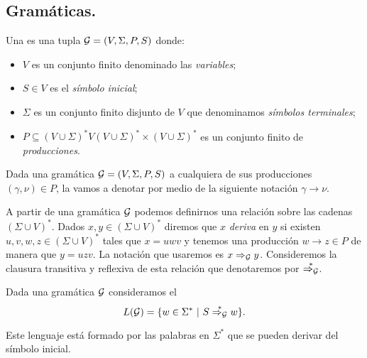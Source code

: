 \documentclass[tesis.tex]{subfiles}
\begin{document}
\subsection{Gramáticas.}

\begin{deff}
	Una  es una tupla ${\cal G} = (V, \Sigma, P, S)$ donde:
	\begin{itemize}
		\item $V$ es un conjunto finito denominado las \emph{variables};
		\item $S \in V$ es el \emph{símbolo inicial};
		\item $\Sigma$ es un conjunto finito disjunto de $V$ que denominamos \emph{símbolos terminales};
		\item $P \subseteq (V \cup \Sigma)^*V(V \cup \Sigma)^* \times (V \cup \Sigma)^*$ es un conjunto finito de \emph{producciones}.
	\end{itemize}
\end{deff}

Dada una gramática ${\cal G} = (V, \Sigma, P, S)$ a cualquiera de sus producciones $(\gamma, \nu) \in P$, la vamos a denotar por medio de la siguiente notación $\gamma \to \nu$. 

A partir de una gramática $\cal G$ podemos definirnos una relación sobre las cadenas $(\Sigma \cup V)^*$. 
Dados $x,y \in (\Sigma \cup V)^*$ diremos que $x$ \emph{deriva} en $y$ si existen $u,v,w,z \in (\Sigma \cup V)^*$ tales que $x = uwv$ y tenemos una producción $w \to z \in P$ de manera que $y=uzv$.
La notación que usaremos es $x \Rightarrow_{\cal G} y$. 
Consideremos la clausura transitiva y reflexiva de esta relación que denotaremos por $\overset{*}{\Rightarrow_{\cal G}}$.

 

\begin{deff}
	Dada una gramática ${\cal G}$ consideramos el  
	\[
	L({\cal G}) = \{ w \in \Sigma^* \ | \ S \overset{*}{\Rightarrow_{\cal G}} w   \}.
	\]
\end{deff}

Este lenguaje está formado por las palabras en $\Sigma^*$ que se pueden derivar del símbolo inicial. 
\end{document}
